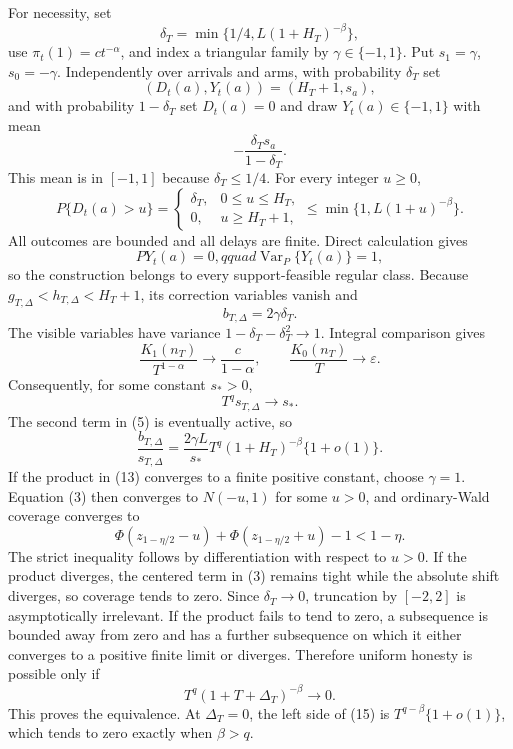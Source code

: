 For necessity, set
\[
 \delta_T=\min\{1/4,L(1+H_T)^{-\beta}\}, \tag{5}
\]
use \(\pi_t(1)=ct^{-\alpha}\), and index a triangular family by \(\gamma\in\{-1,1\}\).  Put \(s_1=\gamma\), \(s_0=-\gamma\).  Independently over arrivals and arms, with probability \(\delta_T\) set
\[
 (D_t(a),Y_t(a))=(H_T+1,s_a), \tag{6}
\]
and with probability \(1-\delta_T\) set \(D_t(a)=0\) and draw \(Y_t(a)\in\{-1,1\}\) with mean
\[
 -\frac{\delta_Ts_a}{1-\delta_T}. \tag{7}
\]
This mean is in \([-1,1]\) because \(\delta_T\leq1/4\).  For every integer \(u\geq0\),
\[
 P\{D_t(a)>u\}=
 \begin{cases}
 \delta_T,&0\leq u\leq H_T,\\
 0,&u\geq H_T+1,
 \end{cases}
 \leq\min\{1,L(1+u)^{-\beta}\}. \tag{8}
\]
All outcomes are bounded and all delays are finite.  Direct calculation gives
\[
 PY_t(a)=0,qquad \operatorname{Var}_P\{Y_t(a)\}=1, \tag{9}
\]
so the construction belongs to every support-feasible regular class.  Because \(g_{T,\Delta}<h_{T,\Delta}<H_T+1\), its correction variables vanish and
\[
 b_{T,\Delta}=2\gamma\delta_T. \tag{10}
\]
The visible variables have variance \(1-\delta_T-\delta_T^2\to1\).  Integral comparison gives
\[
 \frac{K_1(n_T)}{T^{1-\alpha}}\longrightarrow\frac{c}{1-\alpha},
 \qquad \frac{K_0(n_T)}{T}\longrightarrow\varepsilon. \tag{11}
\]
Consequently, for some constant \(s_*>0\),
\[
 T^qs_{T,\Delta}\longrightarrow s_*. \tag{12}
\]
The second term in (5) is eventually active, so
\[
 \frac{b_{T,\Delta}}{s_{T,\Delta}}
 =\frac{2\gamma L}{s_*}T^q(1+H_T)^{-\beta}\{1+o(1)\}. \tag{13}
\]
If the product in (13) converges to a finite positive constant, choose \(\gamma=1\).  Equation (3) then converges to \(N(-u,1)\) for some \(u>0\), and ordinary-Wald coverage converges to
\[
 \Phi(z_{1-\eta/2}-u)+\Phi(z_{1-\eta/2}+u)-1<1-\eta. \tag{14}
\]
The strict inequality follows by differentiation with respect to \(u>0\).  If the product diverges, the centered term in (3) remains tight while the absolute shift diverges, so coverage tends to zero.  Since \(\delta_T\to0\), truncation by \([-2,2]\) is asymptotically irrelevant.  If the product fails to tend to zero, a subsequence is bounded away from zero and has a further subsequence on which it either converges to a positive finite limit or diverges.  Therefore uniform honesty is possible only if
\[
 T^q(1+T+\Delta_T)^{-\beta}\longrightarrow0. \tag{15}
\]
This proves the equivalence.  At \(\Delta_T=0\), the left side of (15) is \(T^{q-\beta}\{1+o(1)\}\), which tends to zero exactly when \(\beta>q\).

